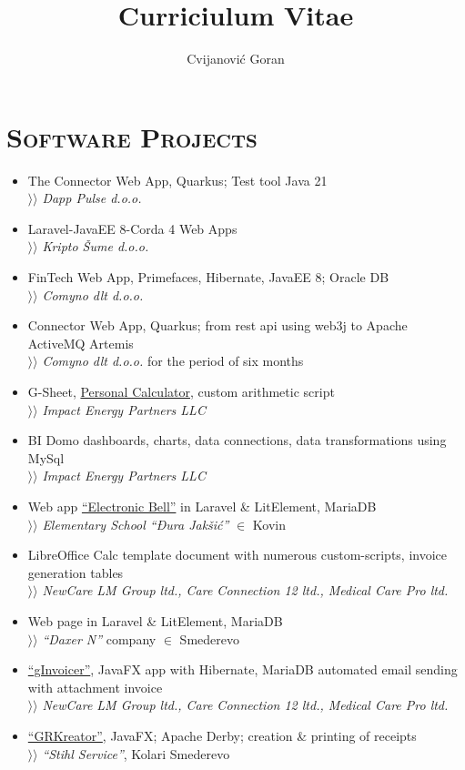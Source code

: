 \documentclass[12pt]{article}
\author{Cvijanović Goran}
\title{Curriciulum Vitae}
\begin{document}
\section{\textsc{Software Projects}}

\begin{itemize}[parsep=1.5pt]
    \item The Connector Web App, Quarkus; Test tool Java 21 \\
        $\rangle\!\rangle$ \textit{Dapp Pulse d.o.o.}
    \item Laravel-JavaEE 8-Corda 4 Web Apps \\
        $\rangle\!\rangle$ \textit{Kripto Šume d.o.o.}
    \item FinTech Web App, Primefaces, Hibernate, JavaEE 8; Oracle DB \\
        $\rangle\!\rangle$ \textit{Comyno dlt d.o.o.}
    \item Connector Web App, Quarkus; from rest api using web3j to Apache ActiveMQ Artemis \\
        $\rangle\!\rangle$ \textit{Comyno dlt d.o.o.} for the period of six months
    \item G-Sheet, \href{https://docs.google.com/spreadsheets/d/1ztJoonmA0d0AyNDwVE1vnjpOPPpM03JF1eWCHwfQ4ZA/edit?usp=sharing}{Personal Calculator}, custom arithmetic script \\
        $\rangle\!\rangle$ \textit{Impact Energy Partners LLC}
    \item BI Domo dashboards, charts, data connections, data transformations using MySql \\
        $\rangle\!\rangle$ \textit{Impact Energy Partners LLC}
    \item Web app \href{https://zvono.nastavnikinformatike.com}{``Electronic Bell''} in Laravel \& LitElement, MariaDB \\
        $\rangle\!\rangle$ \textit{Elementary School ``Đura Jakšić''} $\in$ Kovin
    \item LibreOffice Calc template document with numerous custom-scripts, invoice generation tables \\ 
        $\rangle\!\rangle$ \textit{NewCare LM Group ltd., Care Connection 12 ltd., Medical Care Pro ltd.}
    \item Web page in Laravel \& LitElement, MariaDB \\
        $\rangle\!\rangle$ \textit{``Daxer N''} company $\in$ Smederevo
    \item \href{https://github.com/goranrsbg/gInvoicer}{``gInvoicer''}, JavaFX app with Hibernate, MariaDB automated email sending with attachment invoice \\
        $\rangle\!\rangle$ \textit{NewCare LM Group ltd., Care Connection 12 ltd., Medical Care Pro ltd.}
    \item \href{https://github.com/goranrsbg/GRKreator}{``GRKreator''}, JavaFX; Apache Derby; creation \& printing of receipts \\
        $\rangle\!\rangle$ \textit{``Stihl Service''}, Kolari Smederevo
\end{itemize}
\end{document}
